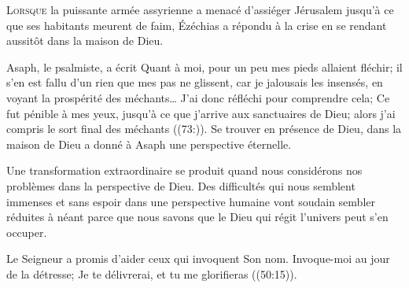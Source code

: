 


\lettrine{L}{orsque} la puissante armée assyrienne a menacé d'assiéger
 Jérusalem jusqu'à ce que ses habitants meurent de faim,
 Ézéchias a répondu à la crise en se rendant aussitôt
 dans la maison de Dieu. 


Asaph, le psalmiste, a écrit\frcolon{} 
 \Og Quant à moi, pour un peu mes pieds allaient fléchir;
 il s’en est fallu d’un rien que mes pas ne glissent,
 car je jalousais les insensés, en voyant la prospérité des méchants\dots{}
 J’ai donc réfléchi pour comprendre cela; Ce fut pénible à mes yeux,
 jusqu’à ce que j’arrive aux sanctuaires de Dieu;
 alors j’ai compris le sort final des méchants \Fg{} ((73:)).
 Se trouver en présence de Dieu, dans la maison de Dieu
 a donné à Asaph une perspective éternelle. 

Une transformation extraordinaire se produit quand nous considérons
 nos problèmes dans la perspective de Dieu.
 Des difficultés qui nous semblent immenses et sans espoir
 dans une perspective humaine vont soudain sembler réduites à néant
 \ocadr parce que nous savons que le Dieu qui régit l'univers
 peut s'en occuper. 

Le Seigneur a promis d'aider ceux qui invoquent Son nom.
 \Og Invoque-moi au jour de la détresse; Je te délivrerai,
 et tu me glorifieras \Fg{} ((50:15)).

\dvrule






